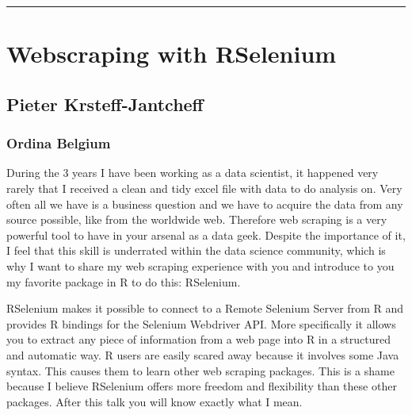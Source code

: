 \documentclass [12pt]{article}
\begin{document}
\noindent\rule{\textwidth}{1pt}
\section{Webscraping with RSelenium}
\subsection*{Pieter Krsteff-Jantcheff}
\subsubsection*{Ordina Belgium}

During the 3 years I have been working as a data scientist, it happened very rarely that I received a clean and tidy excel file with data to do analysis on. Very often all we have is a business question and we have to acquire the data from any source possible, like from the worldwide web. Therefore web scraping is a very powerful tool to have in your arsenal as a data geek. Despite the importance of it, I feel that this skill is underrated within the data science community, which is why I want to share my web scraping experience with you and introduce to you my favorite package in R to do this: RSelenium.

RSelenium makes it possible to connect to a Remote Selenium Server from R and provides R bindings for the Selenium Webdriver API. More specifically it allows you to extract any piece of information from a web page into R in a structured and automatic way. R users are easily scared away because it involves some Java syntax. This causes them to learn other web scraping packages. This is a shame because I believe RSelenium offers more freedom and flexibility than these other packages. After this talk you will know exactly what I mean.
\end{document}
